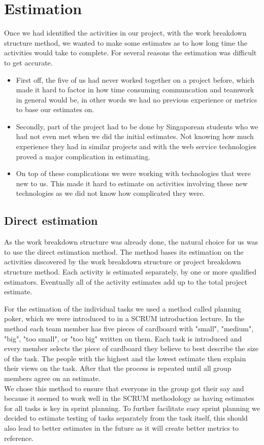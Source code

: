 \section{Estimation}
\label{sec:EmpiriEstimation}
Once we had identified the activities in our project, with the work breakdown structure method, we wanted to make some estimates as to how long time the activities would take to complete. For several reasons the estimation was difficult to get accurate.
\begin{itemize}
\item First off, the five of us had never worked together on a project before, which made it hard to factor in how time consuming communcation and teamwork in general would be, in other words we had no previous experience or metrics to base our estimates on. 

\item Secondly, part of the project had to be done by Singaporean students who we had not even met when we did the initial estimates. Not knowing how much experience they had in similar projects and with the web service technologies proved a major complication in estimating.

\item  On top of these complications we were working with technologies that were new to us. This made it hard to estimate on activities involving these new technologies as we did not know how complicated they were.

\end{itemize}
\subsection{Direct estimation}
As the work breakdown structure was already done, the natural choice for us was to use the direct estimation method\cite{caye}. The method bases its estimation on the activities discovered by the work breakdown structure or project breakdown structure method. Each activity is  estimated separately, by one or more qualified estimators. Eventually all of the activity estimates add up to the total project estimate. 

For the estimation of the individual tasks we used a method called planning poker, which we were introduced to in a SCRUM introduction lecture. In the method each team member has five pieces of cardboard with "small", "medium", "big", "too small", or "too big" written on them. Each task is introduced and every member selects the piece of cardboard they believe to best describe the size of the task. The people with the highest and the lowest estimate then explain their views on the task. After that the process is repeated until all group members agree on an estimate. \\
We chose this method to ensure that everyone in the group got their say and because it seemed to work well in the SCRUM methodology as having estimates for all tasks is key in sprint planning. To further facilitate easy sprint planning we decided to estimate testing of tasks separately from the task itself, this should also lead to better estimates in the future as it will create better metrics to reference.

